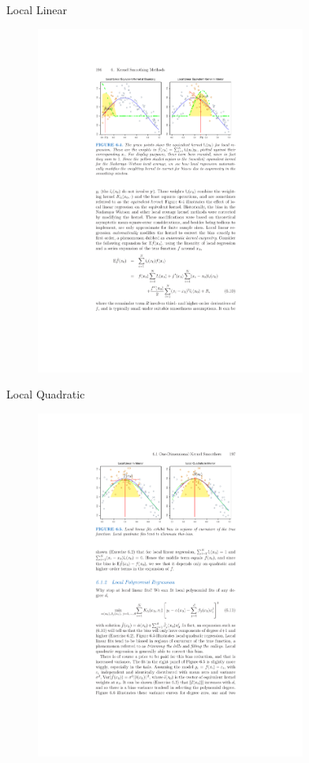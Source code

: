 \documentclass[11pt,handout,xcolor=pdftex,dvipsnames,table,mathserif,aspectratio=169]{beamer}
\begin{document}
 \begin{frame}{Local Linear}
\begin{figure}[htbp]
\begin{center}
\includegraphics[width=3.5in]{./resources/nwloclinear2.pdf}
\label{loclinear2}
\end{center}
\end{figure}
\end{frame}


 \begin{frame}{Local Quadratic}
\begin{figure}[htbp]
\begin{center}
\includegraphics[width=3.5in]{./resources/locquad.pdf}
\label{loclinear2}
\end{center}
\end{figure}
\end{frame}
\end{document}
